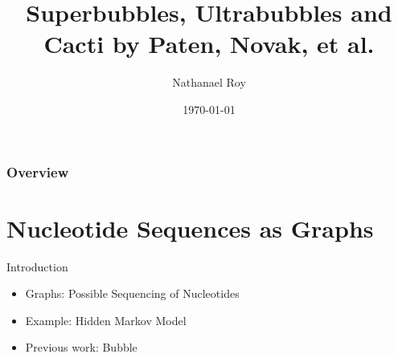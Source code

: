 \documentclass{beamer}
\title[Short title]{Superbubbles, Ultrabubbles and Cacti by Paten, Novak, et al.} %
\author{Nathanael Roy} %
\institute[UC Riverside] %
{
University of California \\ %
\medskip
}
\date{\today} %
\begin{document}
\begin{frame}
\titlepage %
\end{frame}

\begin{frame}
\frametitle{Overview} %
\tableofcontents %
\end{frame}



\section{Nucleotide Sequences as Graphs}
\begin{frame}{Introduction}
    \begin{itemize}
        \item Graphs: Possible Sequencing of Nucleotides
        \item Example: Hidden Markov Model
        \item Previous work: Bubble
    \end{itemize}
\end{frame}
\end{document}
